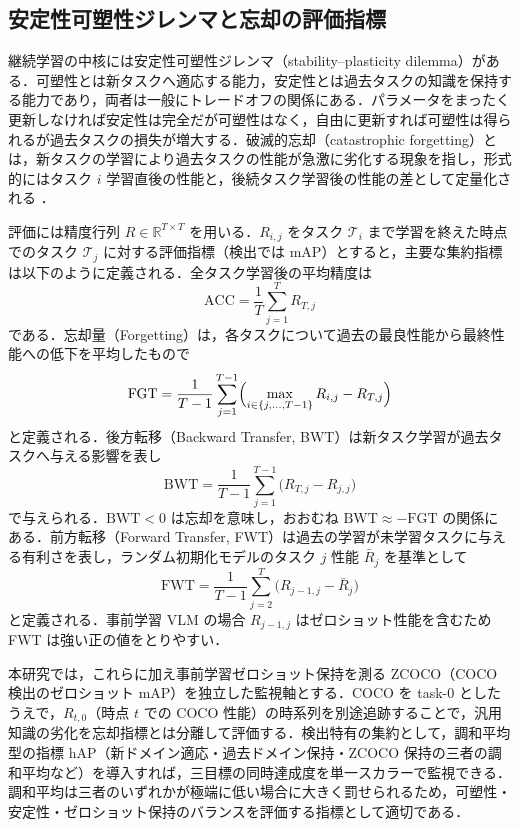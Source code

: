 \subsection{安定性可塑性ジレンマと忘却の評価指標}

継続学習の中核には安定性可塑性ジレンマ（stability--plasticity dilemma）がある．可塑性とは新タスクへ適応する能力，安定性とは過去タスクの知識を保持する能力であり，両者は一般にトレードオフの関係にある．パラメータをまったく更新しなければ安定性は完全だが可塑性はなく，自由に更新すれば可塑性は得られるが過去タスクの損失が増大する．破滅的忘却（catastrophic forgetting）とは，新タスクの学習により過去タスクの性能が急激に劣化する現象を指し，形式的にはタスク $i$ 学習直後の性能と，後続タスク学習後の性能の差として定量化される \cite{clsurvey}．

評価には精度行列 $R\in\mathbb{R}^{T\times T}$ を用いる．$R_{i,j}$ をタスク $\mathcal{T}_i$ まで学習を終えた時点でのタスク $\mathcal{T}_j$ に対する評価指標（検出では mAP）とすると，主要な集約指標は以下のように定義される．全タスク学習後の平均精度は
\begin{equation}
\mathrm{ACC}=\frac{1}{T}\sum_{j=1}^{T}R_{T,j}
\end{equation}
である．忘却量（Forgetting）は，各タスクについて過去の最良性能から最終性能への低下を平均したもので
\begin{equation}
\mathrm{FGT}=\frac{1}{T-1}\sum_{j=1}^{T-1}\Bigl(\max_{i\in\{j,\ldots,T-1\}}R_{i,j}-R_{T,j}\Bigr)
\end{equation}
と定義される．後方転移（Backward Transfer, BWT）は新タスク学習が過去タスクへ与える影響を表し
\begin{equation}
\mathrm{BWT}=\frac{1}{T-1}\sum_{j=1}^{T-1}\bigl(R_{T,j}-R_{j,j}\bigr)
\end{equation}
で与えられる．$\mathrm{BWT}<0$ は忘却を意味し，おおむね $\mathrm{BWT}\approx-\mathrm{FGT}$ の関係にある．前方転移（Forward Transfer, FWT）は過去の学習が未学習タスクに与える有利さを表し，ランダム初期化モデルのタスク $j$ 性能 $\bar{R}_j$ を基準として
\begin{equation}
\mathrm{FWT}=\frac{1}{T-1}\sum_{j=2}^{T}\bigl(R_{j-1,j}-\bar{R}_j\bigr)
\end{equation}
と定義される．事前学習 VLM の場合 $R_{j-1,j}$ はゼロショット性能を含むため FWT は強い正の値をとりやすい．

本研究では，これらに加え事前学習ゼロショット保持を測る ZCOCO（COCO 検出のゼロショット mAP）を独立した監視軸とする．COCO を task-0 としたうえで，$R_{t,0}$（時点 $t$ での COCO 性能）の時系列を別途追跡することで，汎用知識の劣化を忘却指標とは分離して評価する．検出特有の集約として，調和平均型の指標 hAP（新ドメイン適応・過去ドメイン保持・ZCOCO 保持の三者の調和平均など）を導入すれば，三目標の同時達成度を単一スカラーで監視できる．調和平均は三者のいずれかが極端に低い場合に大きく罰せられるため，可塑性・安定性・ゼロショット保持のバランスを評価する指標として適切である．

